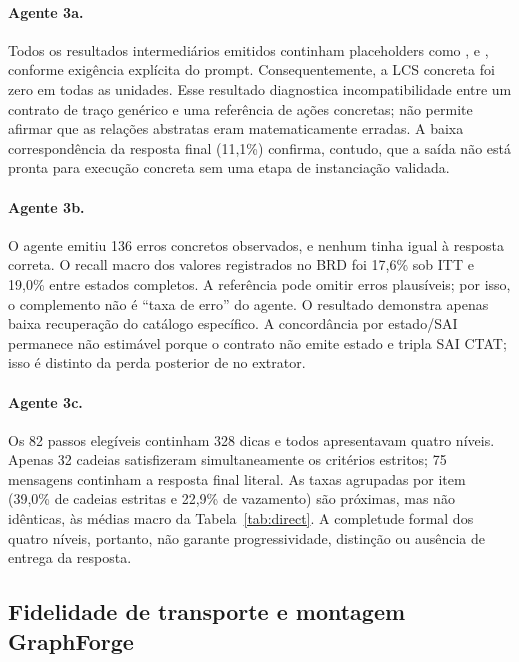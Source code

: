 \documentclass[11pt,a4paper]{article}
\newcommand{\ITT}{ITT}
\begin{document}
\paragraph{Agente 3a.} Todos os resultados intermediários emitidos continham placeholders como ,  e , conforme exigência explícita do prompt. Consequentemente, a LCS concreta foi zero em todas as unidades. Esse resultado diagnostica incompatibilidade entre um contrato de traço genérico e uma referência de ações concretas; não permite afirmar que as relações abstratas eram matematicamente erradas. A baixa correspondência da resposta final (11,1\%) confirma, contudo, que a saída não está pronta para execução concreta sem uma etapa de instanciação validada.

\paragraph{Agente 3b.} O agente emitiu 136 erros concretos observados, e nenhum tinha  igual à resposta correta. O recall macro dos valores registrados no BRD foi 17,6\% sob \ITT{} e 19,0\% entre estados completos. A referência pode omitir erros plausíveis; por isso, o complemento não é ``taxa de erro'' do agente. O resultado demonstra apenas baixa recuperação do catálogo específico. A concordância por estado/SAI permanece não estimável porque o contrato não emite estado e tripla SAI CTAT; isso é distinto da perda posterior de  no extrator.

\paragraph{Agente 3c.} Os 82 passos elegíveis continham 328 dicas e todos apresentavam quatro níveis. Apenas 32 cadeias satisfizeram simultaneamente os critérios estritos; 75 mensagens continham a resposta final literal. As taxas agrupadas por item (39,0\% de cadeias estritas e 22,9\% de vazamento) são próximas, mas não idênticas, às médias macro da Tabela~\ref{tab:direct}. A completude formal dos quatro níveis, portanto, não garante progressividade, distinção ou ausência de entrega da resposta.

\subsection{Fidelidade de transporte e montagem GraphForge}
\end{document}
